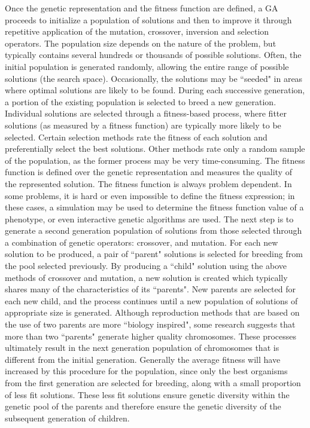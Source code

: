 Once the genetic representation and the fitness function are defined, a GA proceeds to initialize a population of solutions and then to improve it through repetitive application of the mutation, crossover, inversion and selection operators.
The population size depends on the nature of the problem, but typically contains several hundreds or thousands of possible solutions. Often, the initial population is generated randomly, allowing the entire range of possible solutions (the search space). Occasionally, the solutions may be ``seeded" in areas where optimal solutions are likely to be found.
During each successive generation, a portion of the existing population is selected to breed a new generation. Individual solutions are selected through a fitness-based process, where fitter solutions (as measured by a fitness function) are typically more likely to be selected. Certain selection methods rate the fitness of each solution and preferentially select the best solutions. Other methods rate only a random sample of the population, as the former process may be very time-consuming.
The fitness function is defined over the genetic representation and measures the quality of the represented solution. The fitness function is always problem dependent.
In some problems, it is hard or even impossible to define the fitness expression; in these cases, a simulation may be used to determine the fitness function value of a phenotype, or even interactive genetic algorithms are used.
The next step is to generate a second generation population of solutions from those selected through a combination of genetic operators: crossover, and mutation.
For each new solution to be produced, a pair of ``parent" solutions is selected for breeding from the pool selected previously. By producing a ``child" solution using the above methods of crossover and mutation, a new solution is created which typically shares many of the characteristics of its ``parents". New parents are selected for each new child, and the process continues until a new population of solutions of appropriate size is generated. Although reproduction methods that are based on the use of two parents are more ``biology inspired", some research suggests that more than two ``parents" generate higher quality chromosomes.
These processes ultimately result in the next generation population of chromosomes that is different from the initial generation. Generally the average fitness will have increased by this procedure for the population, since only the best organisms from the first generation are selected for breeding, along with a small proportion of less fit solutions. These less fit solutions ensure genetic diversity within the genetic pool of the parents and therefore ensure the genetic diversity of the subsequent generation of children.
